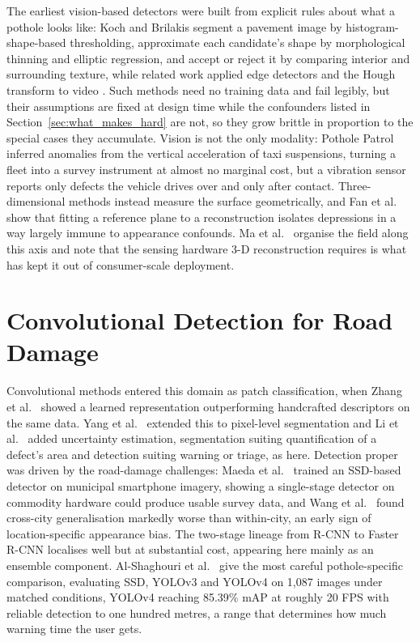 \documentclass[MScCS]{uccthesis}
\begin{document}
The earliest vision-based detectors were built from explicit rules about what a
pothole looks like: Koch and Brilakis \parencite{koch2011pothole} segment a
pavement image by histogram-shape-based thresholding, approximate each
candidate's shape by morphological thinning and elliptic regression, and accept
or reject it by comparing interior and surrounding texture, while related work
applied edge detectors and the Hough transform to video
\parencite{nienaber2015detecting}. Such methods need no training data and fail
legibly, but their assumptions are fixed at design time while the confounders
listed in Section~\ref{sec:what_makes_hard} are not, so they grow brittle in
proportion to the special cases they accumulate. Vision is not the only
modality: Pothole Patrol \parencite{eriksson2008pothole} inferred anomalies from
the vertical acceleration of taxi suspensions, turning a fleet into a survey
instrument at almost no marginal cost, but a vibration sensor reports only
defects the vehicle drives over and only after contact. Three-dimensional
methods instead measure the surface geometrically, and Fan et
al.~\parencite{fan2022rethinking} show that fitting a reference plane to a
reconstruction isolates depressions in a way largely immune to appearance
confounds. Ma et al.~\parencite{ma2022computer} organise the field along this
axis and note that the sensing hardware 3-D reconstruction requires is what has
kept it out of consumer-scale deployment.


\section{Convolutional Detection for Road Damage}
\label{sec:cnn_rdd}

Convolutional methods entered this domain as patch classification, when Zhang et
al.~\parencite{zhang2016road} showed a learned representation outperforming
handcrafted descriptors on the same data. Yang et
al.~\parencite{yang2020automated} extended this to pixel-level segmentation and
Li et al.~\parencite{li2023pavement} added uncertainty estimation, segmentation
suiting quantification of a defect's area and detection suiting warning or
triage, as here. Detection proper was driven by the road-damage challenges:
Maeda et al.~\parencite{maeda2018road} trained an SSD-based detector on
municipal smartphone imagery, showing a single-stage detector on commodity
hardware could produce usable survey data, and Wang et
al.~\parencite{wang2020road} found cross-city generalisation markedly worse than
within-city, an early sign of location-specific appearance bias. The two-stage
lineage from R-CNN \parencite{girshick2014rcnn} to Faster R-CNN
\parencite{ren2015faster} localises well but at substantial cost, appearing here
mainly as an ensemble component. Al-Shaghouri et
al.~\parencite{alshaghouri2021realtime} give the most careful pothole-specific
comparison, evaluating SSD, YOLOv3 and YOLOv4 on 1,087 images under matched
conditions, YOLOv4 reaching 85.39\% mAP at roughly 20 FPS with reliable
detection to one hundred metres, a range that determines how much warning time
the user gets.
\end{document}
